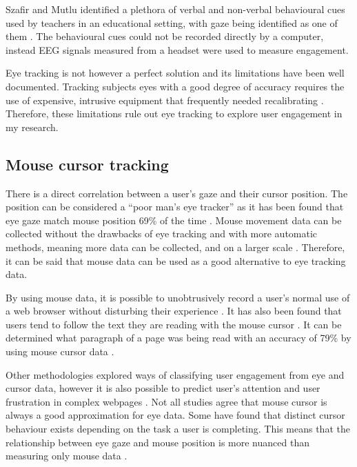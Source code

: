 \documentclass{article}
\begin{document}
Szafir and Mutlu identified a plethora of verbal and non-verbal behavioural cues used by teachers in an educational setting, with gaze being identified as one of them \cite{szafir2012pay}.
The behavioural cues could not be recorded directly by a computer, instead EEG signals measured from a headset were used to measure engagement.

Eye tracking is not however a perfect solution and its limitations have been well documented. 
Tracking subjects eyes with a good degree of accuracy requires the use of expensive, intrusive equipment that frequently needed recalibrating \cite{richardson2004eye}. 
Therefore, these limitations rule out eye tracking to explore user engagement in my research.

\subsection{Mouse cursor tracking}

There is a direct correlation between a user’s gaze and their cursor position. 
The position can be considered a ``poor man’s eye tracker'' as it has been found that eye gaze match mouse position 69\% of the time \cite{cooke2006mouse}. 
Mouse movement data can be collected without the drawbacks of eye tracking and with more automatic methods, meaning more data can be collected, and on a larger scale \cite{demvsar2017quantifying}.
Therefore, it can be said that mouse data can be used as a good alternative to eye tracking data.

By using mouse data, it is possible to unobtrusively record a user’s normal use of a web browser without disturbing their experience \cite{goecks2000learning}.
It has also been found that users tend to follow the text they are reading with the mouse cursor \cite{liu2007detecting}. 
It can be determined what paragraph of a page was being read with an accuracy of 79\% by using mouse cursor data \cite{hauger2011using}. 

Other methodologies explored ways of classifying user engagement from eye and cursor data, however it is also possible to predict user's attention and user frustration in complex webpages \cite{navalpakkam2012mouse}.
Not all studies agree that mouse cursor is always a good approximation for eye data. 
Some have found that distinct cursor behaviour exists depending on the task a user is completing.
This means that the relationship between eye gaze and mouse position is more nuanced than measuring only mouse data \cite{huang2012user}.
\end{document}
